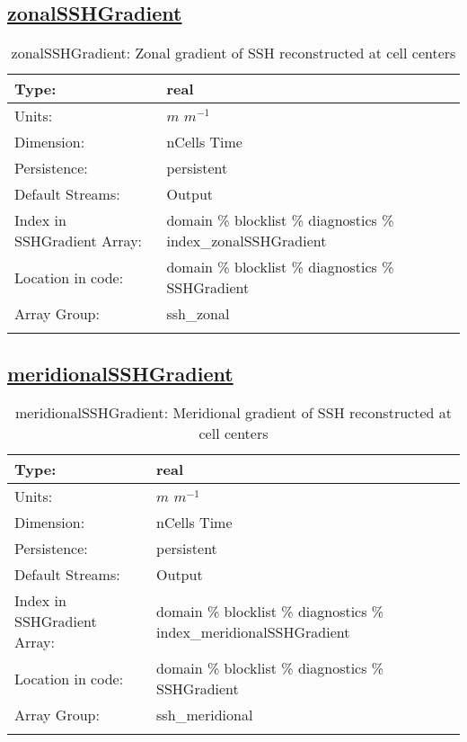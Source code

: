 \subsection[zonalSSHGradient]{\hyperref[sec:var_tab_diagnostics]{zonalSSHGradient}}
\label{subsec:var_sec_diagnostics_zonalSSHGradient}
\begin{center}
\begin{longtable}{| p{2.0in} | p{4.0in} |}
        \hline 
        Type: & real \\
        \hline 
        Units: & $m$ $m^{-1}$ \\
        \hline 
        Dimension: & nCells Time \\
        \hline 
        Persistence: & persistent \\
        \hline 
		 Default Streams: & Output  \\
        \hline 
		 Index in SSHGradient Array: & domain \% blocklist \% diagnostics \% index\_zonalSSHGradient \\
		 \hline 
		 Location in code: & domain \% blocklist \% diagnostics \% SSHGradient \\
		 \hline 
		 Array Group: & ssh\_zonal \\
		 \hline 
    \caption{zonalSSHGradient: Zonal gradient of SSH reconstructed at cell centers}
\end{longtable}
\end{center}
\subsection[meridionalSSHGradient]{\hyperref[sec:var_tab_diagnostics]{meridionalSSHGradient}}
\label{subsec:var_sec_diagnostics_meridionalSSHGradient}
\begin{center}
\begin{longtable}{| p{2.0in} | p{4.0in} |}
        \hline 
        Type: & real \\
        \hline 
        Units: & $m$ $m^{-1}$ \\
        \hline 
        Dimension: & nCells Time \\
        \hline 
        Persistence: & persistent \\
        \hline 
		 Default Streams: & Output  \\
        \hline 
		 Index in SSHGradient Array: & domain \% blocklist \% diagnostics \% index\_meridionalSSHGradient \\
		 \hline 
		 Location in code: & domain \% blocklist \% diagnostics \% SSHGradient \\
		 \hline 
		 Array Group: & ssh\_meridional \\
		 \hline 
    \caption{meridionalSSHGradient: Meridional gradient of SSH reconstructed at cell centers}
\end{longtable}
\end{center}
